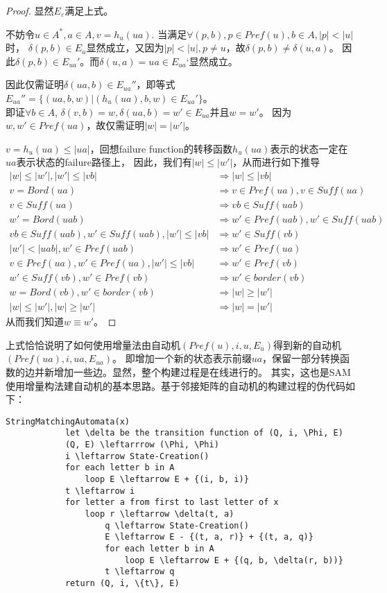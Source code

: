 \documentclass[UTF8]{ctexart}
\theoremstyle{definition}
\theoremstyle{remark}
\numberwithin{equation}{subsection}
\begin{document}
	\begin{proof}
		显然$E_\varepsilon$满足上式。
		
		不妨令$u \in A^*, a \in A, v = h_u(ua)$.
		当满足$\forall (p,b), p \in Pref(u), b \in A, |p|<|u|$时，
		$\delta(p,b) \in E_u$显然成立，又因为$|p| < |u|, p \neq u$，故$\delta(p,b) \neq \delta(u,a)$。
		因此$\delta(p,b) \in E_{ua}'$。而$\delta(u,a) = ua \in E_{ua}‘$显然成立。
		
		因此仅需证明$\delta(ua,b) \in E_{ua}''$，即等式$E_{ua}'' = \{ (ua,b,w) | (h_u(ua), b, w) \in E_{ua}' \}$。\\
		即证$\forall b \in A$, $\delta(v,b)=w,\delta(ua,b)=w' \in E_{ua}$并且$w = w'$。
		因为$w,w' \in Pref(ua)$，故仅需证明$|w| = |w'|$。
		
		$v = h_u(ua) \le |ua|$，回想failure function的转移函数$h_u(ua)$表示的状态一定在$ua$表示状态的failure路径上，
		因此，我们有$|w| \le |w'|$，从而进行如下推导
		\begin{align*}
			|w| \le |w'|, |w'| \le |vb| 	&\Rightarrow 	|w| \le |vb|			\\
			v = Bord(ua)					&\Rightarrow	v \in Pref(ua), v \in Suff(ua)	\\
			v \in Suff(ua) 					&\Rightarrow 	vb \in Suff(uab)	\\
			w' = Bord(uab) 				&\Rightarrow 	w' \in Pref(uab), w' \in Suff(uab)	\\
			vb \in Suff(uab), w' \in Suff(uab), |w'| \le |vb| &\Rightarrow w' \in Suff(vb)	\\
			|w'| < |uab|, w' \in Pref(uab)	&\Rightarrow	w' \in Pref(ua)		\\
			v \in Pref(ua), w' \in Pref(ua), |w'| \le |vb|	&\Rightarrow w' \in Pref(vb)	\\
			w' \in Suff(vb), w' \in Pref(vb) &\Rightarrow 	w' \in border(vb)	\\
			w = Bord(vb), w' \in border(vb) &\Rightarrow 	|w| \ge |w'|	\\
			|w|\le|w'|, |w|\ge|w'|			&\Rightarrow 	|w| = |w'|
		\end{align*}
		从而我们知道$w \equiv w'$。	
	\end{proof}
	上式恰恰说明了如何使用增量法由自动机$(Pref(u), i, {u}, E_u)$得到新的自动机$(Pref(ua), i, {ua}, E_{ua})$。
	即增加一个新的状态表示前缀$ua$，保留一部分转换函数的边并新增加一些边。显然，整个构建过程是在线进行的。
	其实，这也是SAM使用增量构法建自动机的基本思路。基于邻接矩阵的自动机的构建过程的伪代码如下：
	\begin{lstlisting}[frame=shadowbox,framexleftmargin=5mm,rulesepcolor=\color{gray},numbers=none]
		StringMatchingAutomata(x)
			let \delta be the transition function of (Q, i, \Phi, E)
			(Q, E) \leftarrrow (\Phi, \Phi)
			i \leftarrow State-Creation()
			for each letter b in A
				loop E \leftarrow E + {(i, b, i)}
			t \leftarrow i
			for letter a from first to last letter of x
				loop r \leftarrow \delta(t, a)
					q \leftarrow State-Creation()
					E \leftarrow E - {(t, a, r)} + {(t, a, q)}
					for each letter b in A
						loop E \leftarrow E + {(q, b, \delta(r, b))}
					t \leftarrow q
			return (Q, i, \{t\}, E)
	\end{lstlisting}
	
\end{document}
